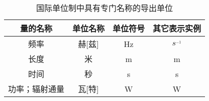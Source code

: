 \begin{denotation}
\begin{table}[h]%
\caption{国际单位制中具有专门名称的导出单位}
\vspace{0.5em}\centering\wuhao
\begin{tabular}{cccc}
\toprule[1.5pt]
量的名称&单位名称&单位符号&其它表示实例\\
\midrule[1pt]
频率&赫[兹]&Hz&$s^_{-1}$\\
长度&米&m&m\\
时间&秒&s&s\\
功率；辐射通量&瓦[特]&W&W\\


\bottomrule[1.5pt]
\end{tabular}
\end{table}
\end{denotation}
